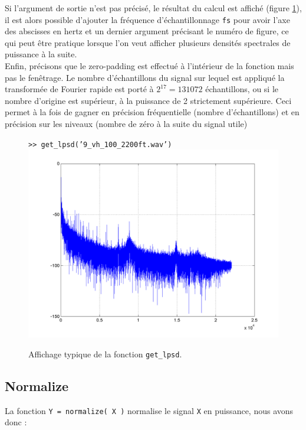     Si l'argument de sortie n'est pas pr{\'e}cis{\'e}, le r{\'e}sultat
    du calcul est affich{\'e} (figure \ref{figpsd}), il est alors possible
    d'ajouter la fr{\'e}quence d'{\'e}chantillonnage {\tt fs} pour avoir l'axe des abscisses en hertz
    et un dernier argument pr{\'e}cisant le num{\'e}ro de figure,
    ce qui peut {\^e}tre pratique lorsque l'on veut afficher
    plusieurs densit{\'e}s spectrales de puissance {\`a} la suite.\\

    Enfin, pr{\'e}cisons que le zero-padding est effectu{\'e} {\`a} l'int{\'e}rieur
    de la fonction mais pas le fen{\^e}trage. Le nombre d'{\'e}chantillons
    du signal sur lequel est appliqu{\'e} la transform{\'e}e de Fourier
    rapide est port{\'e} {\`a} $2^{17} = 131072$ {\'e}chantillons, ou si le
    nombre d'origine est sup{\'e}rieur, {\`a} la puissance de 2
    strictement sup{\'e}rieure. Ceci permet {\`a} la fois de gagner en
    pr{\'e}cision fr{\'e}quentielle (nombre d'{\'e}chantillons) et en
    pr{\'e}cision sur les niveaux (nombre de z{\'e}ro {\`a} la suite du signal
    utile)\\

    \medskip
    \begin{figure}[h]
      \centering
      {\tt >> get\_lpsd('9\_vh\_100\_2200ft.wav')}\\
      \includegraphics[width=12cm]{figures/lpsd.png}\\
      \caption{Affichage typique de la fonction {\tt get\_lpsd}.}
      \label{figpsd}
    \end{figure}
    \medskip


    \newpage
    \subsection{Normalize}
    \label{normalize}
    La fonction {\tt Y = normalize( X )} normalise le signal {\tt X}
    en puissance, nous avons donc :

